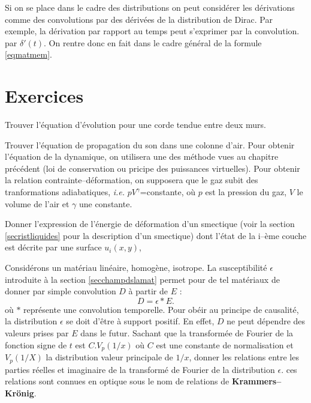 \documentclass[12pt]{book}
\begin{document}
\begin{rem}
Si on se place dans le cadre des distributions on peut consid\'erer les
d\'erivations comme des convolutions par des d\'eriv\'ees de la distribution
de Dirac. Par exemple, la d\'erivation par rapport au temps peut
s'exprimer par la convolution.
par $\delta '(t)$. On rentre donc en fait dans le cadre g\'en\'eral de
la formule \ref{eqmatmem}.
\end{rem}

\section{Exercices}

\begin{exo}
Trouver l'\'equation d'\'evolution pour une corde tendue entre deux murs.
\end{exo}

\begin{exo}
Trouver l'\'equation de propagation du son dans une colonne d'air. Pour
obtenir l'\'equation de la dynamique, on utilisera une des m\'ethode vues au
chapitre pr\'ec\'edent (loi de conservation ou pricipe des puissances
virtuelles). Pour obtenir la relation contrainte--d\'eformation, on supposera
que le gaz subit des tranformations adiabatiques, {\it i.e.}
$pV^{\gamma}$=constante, o\`u $p$ est la pression du gaz, $V$ le volume de
l'air et $\gamma$ une constante.
\end{exo}

\begin{exo}
Donner l'expression de l'\'energie de d\'eformation d'un smectique (voir la
section \ref{secristliquides} pour la description d'un smectique) dont
l'\'etat de la i--\`eme couche est d\'ecrite par une surface $u_i(x,y)$,
\end{exo}

\begin{exo}
Consid\'erons un mat\'eriau lin\'eaire, homog\`ene, isotrope. 
La susceptibilit\'e $\epsilon$ introduite \`a la section \ref{secchampdslamat}
permet pour de tel mat\'eriaux de donner par simple convolution $D$ \`a partir
de $E$ :
\begin{equation}\label{eqexsusc}
D=\epsilon * E.
\end{equation}
o\`u $*$ repr\'esente une convolution temporelle. Pour ob\'eir au principe de
causalit\'e, la distribution $\epsilon$ se doit d'\^etre \`a support
positif. En effet, $D$ ne peut d\'ependre des valeurs prises par $E$ dans le
futur. Sachant que la transform\'ee de Fourier de la fonction signe de $t$ est
$C.V_p(1/x)$ o\`u $C$ est une constante de normalisation et $V_p(1/X)$ la
distribution valeur principale de $1/x$, donner les relations entre les
parties r\'eelles et imaginaire de la transform\'e de Fourier de la
distribution $\epsilon$.  ces relations sont connues en optique sous le nom de
relations de {\bf Krammers--Kr\"onig}.
\end{exo}
\end{document}
